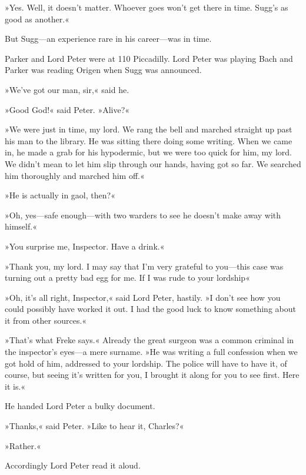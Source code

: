 »Yes. Well, it doesn't matter. Whoever goes won't get there in time. Sugg's as good as another.«

But Sugg—an experience rare in his career—was in time.

Parker and Lord Peter were at 110 Piccadilly. Lord Peter was playing Bach and Parker was reading Origen when Sugg was announced.

»We've got our man, sir,« said he.

»Good God!« said Peter. »Alive?«

»We were just in time, my lord. We rang the bell and marched straight up past his man to the library. He was sitting there doing some writing. When we came in, he made a grab for his hypodermic, but we were too quick for him, my lord. We didn't mean to let him slip through our hands, having got so far. We searched him thoroughly and marched him off.«

»He is actually in gaol, then?«

»Oh, yes—safe enough—with two warders to see he doesn't make away with himself.«

»You surprise me, Inspector. Have a drink.«

»Thank you, my lord. I may say that I'm very grateful to you—this case was turning out a pretty bad egg for me. If I was rude to your lordship\longdash«

»Oh, it's all right, Inspector,« said Lord Peter, hastily. »I don't see how you could possibly have worked it out. I had the good luck to know something about it from other sources.«

»That's what Freke says.« Already the great surgeon was a common criminal in the inspector's eyes—a mere surname. »He was writing a full confession when we got hold of him, addressed to your lordship. The police will have to have it, of course, but seeing it's written for you, I brought it along for you to see first. Here it is.«

He handed Lord Peter a bulky document.

»Thanks,« said Peter. »Like to hear it, Charles?«

»Rather.«

Accordingly Lord Peter read it aloud.
